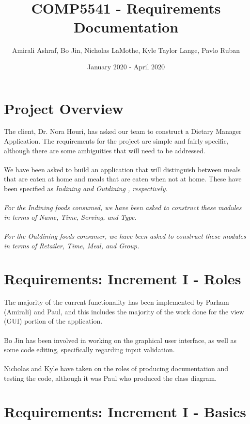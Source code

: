 \documentclass{article}
\title{COMP5541 - Requirements Documentation}
\author{\centerline{Amirali Ashraf, Bo Jin, Nicholas LaMothe, Kyle Taylor Lange, Pavlo Ruban}}
\date{January 2020 - April 2020}
\begin{document}
\maketitle

\section{Project Overview}

The client, Dr. Nora Houri, has asked our team to construct a Dietary Manager Application. The requirements for the project are simple and fairly specific, although there are some ambiguities that will need to be addressed.
\\\\
We have been asked to build an application that will distinguish between meals that are eaten at home and meals that are eaten when not at home. These have been specified as \em Indining \em and \em Outdining \em, respectively. 
\\\\
For the Indining foods consumed, we have been asked to construct these modules in terms of Name, Time, Serving, and Type.
\\\\
For the Outdining foods consumer, we have been asked to construct these modules in terms of Retailer, Time, Meal, and Group.
\\
\section{Requirements: Increment I - Roles}
The majority of the current functionality has been implemented by Parham (Amirali) and Paul, and this includes the majority of the work done for the view (GUI) portion of the application.
\\\\
Bo Jin has been involved in working on the graphical user interface, as well as some code editing, specifically regarding input validation. 
\\\\
Nicholas and Kyle have taken on the roles of producing documentation and testing the code, although it was Paul who produced the class diagram.
\\
\section{Requirements: Increment I - Basics}
\end{document}
